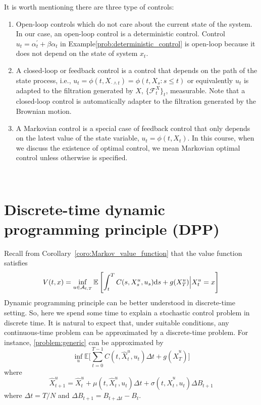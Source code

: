\documentclass[11pt]{book}
\newcommand{\ds}{\text{\normalfont d}s}
\begin{document}
It is worth mentioning there are three type of controls:
\begin{enumerate}
    \item Open-loop controls which do not care about the current state of the system. In our case, an open-loop control is a deterministic control. Control $u_t=\alpha^\prime_t+\beta \alpha_t$ in Example\ref{prob:deterministic_control}  is open-loop because it does not depend on the state of system $x_t$.
    \item A closed-loop or feedback control is a control that depends on the path of the state process, i.e., $u_t = \phi(t,X_{\cdot\wedge t})=\phi(t,X_s:s\le t)$ or equivalently $u_t$ is adapted to the filtration generated by $X$, $\{\mathcal{F}_t^X\}_t$, measurable. Note that a closed-loop control is automatically adapter to the filtration generated by the Brownian motion.
    \item A Markovian control is a special case of feedback control that only depends on the latest value of the state variable, $u_t=\phi(t,X_t)$. In this course, when we discuss the existence of optimal control, we mean Markovian optimal control unless otherwise is specified.
\end{enumerate}
\



\section{Discrete-time dynamic programming principle (DPP)}
Recall from Corollary~\ref{coro:Markov_value_function} that the value function satisfies
\begin{equation}\label{eqn:value_function}
    V(t,x) =\inf_{u\in\mathcal{A}_{t,T}}\mathbb{E}\left[\int_{t}^{T}C(s,X_s^u,u_s){{\ds}}+g(X_T^u)\Big|X^u_t=x\right]
\end{equation}
Dynamic programming principle can be better understood in discrete-time setting. So, here we spend some time to explain a stochastic control problem in discrete time. It is natural to expect that, under suitable conditions, any continuous-time problem can be approximated by a discrete-time problem. For instance, \eqref{problem:generic} can be approximated by 
\begin{equation}
    \inf_{u} \mathbb{E}\bigg[\sum_{t=0}^{T-1}C(t,\hat{X}^u_t,u_t)\Delta t+g(\hat{X}^u_T)\bigg]
\end{equation}
where 
\begin{equation}
    \hat{X}^u_{t+1} =\hat{X}^u_t+\mu(t,\hat{X}^u_t,u_t)\Delta t+\sigma(t,\hat{X}^u_t,u_t)\Delta B_{t+1}
\end{equation}
where $\Delta t=T/N$ and $\Delta B_{t+1}=B_{t+\Delta t}-B_{t}$.
\end{document}
